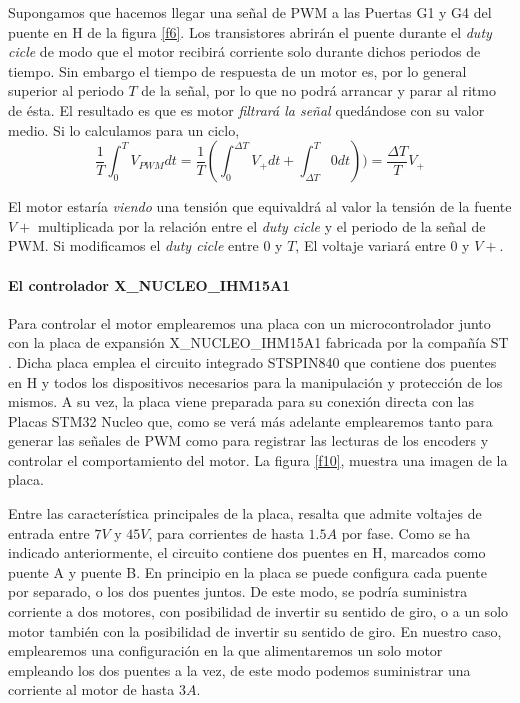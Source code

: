 \documentclass[10pt,a4paper]{report}
\begin{document}
Supongamos que hacemos llegar una señal de PWM a las Puertas G1 y G4 del puente en H de la figura \ref{f6}. Los transistores abrirán el puente durante el \emph{duty cicle} de modo que el motor recibirá corriente solo durante dichos periodos de tiempo. Sin embargo el tiempo de respuesta de un motor es, por lo general superior al periodo $T$ de la señal, por lo que no podrá arrancar y parar al ritmo de ésta. El resultado es que es motor \emph{filtrará la señal} quedándose con su valor medio. Si lo calculamos para un ciclo,
\begin{equation}
\frac{1}{T}\int^T_0 V_{PWM}dt = \frac{1}{T}\left(\int^{\Delta T}_0 V_{+}dt 
+ \int^{T}_{\Delta T} 0 dt\right)) = \frac{\Delta T}{T}V_{+}
\end{equation}

El motor estaría  \emph{viendo} una tensión que equivaldrá al valor la tensión de la fuente $V+$ multiplicada por la relación entre el \emph{duty cicle} y el periodo de la señal de PWM. Si modificamos el \emph{duty cicle} entre $0$ y $T$, El voltaje variará entre $0$ y $V+$.

\paragraph{El controlador X\_NUCLEO\_IHM15A1} Para controlar el motor emplearemos una placa con un microcontrolador junto con  la placa de expansión X\_NUCLEO\_IHM15A1 fabricada por la compañía ST \cite{IHM15}. Dicha placa emplea el circuito integrado  STSPIN840  \cite{STSPIN840} que contiene dos puentes en H y todos los dispositivos necesarios para la manipulación y protección de los mismos. A su vez, la placa viene preparada para su conexión directa con las Placas STM32 Nucleo que, como se verá más adelante emplearemos tanto para generar las señales de PWM como para registrar las lecturas de los encoders y controlar el comportamiento del motor. La figura \ref{f10}, muestra una imagen de la placa. 

Entre las característica principales de la placa, resalta que admite voltajes de entrada entre $7V$ y $45V$, para corrientes de hasta $1.5 A$ por fase. Como se ha indicado anteriormente, el circuito contiene dos puentes en H, marcados como puente A y puente B.  En principio en la placa se puede configura  cada puente por separado, o los dos puentes juntos. De este modo, se podría suministra corriente a dos motores, con posibilidad de invertir su sentido de giro, o a un solo motor también con la posibilidad de invertir su sentido de giro. En nuestro caso, emplearemos  una configuración en la que alimentaremos un solo motor empleando los dos puentes a la vez, de este modo podemos suministrar una corriente al motor de hasta $3 A$.  
\end{document}
